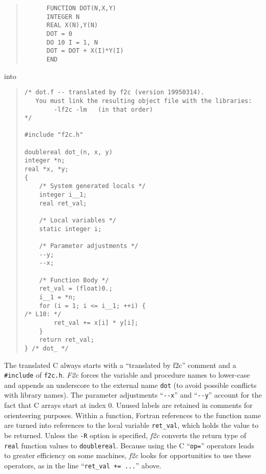 \documentclass[10pt,a4paper]{article}
\begin{document}
\begin{quote}
\begin{verbatim}
      FUNCTION DOT(N,X,Y)
      INTEGER N
      REAL X(N),Y(N)
      DOT = 0
      DO 10 I = 1, N
      DOT = DOT + X(I)*Y(I)
      END
\end{verbatim}
\end{quote}
into
\begin{quote}
\begin{verbatim}
/* dot.f -- translated by f2c (version 19950314).
   You must link the resulting object file with the libraries:
        -lf2c -lm   (in that order)
*/

#include "f2c.h"

doublereal dot_(n, x, y)
integer *n;
real *x, *y;
{
    /* System generated locals */
    integer i__1;
    real ret_val;

    /* Local variables */
    static integer i;

    /* Parameter adjustments */
    --y;
    --x;

    /* Function Body */
    ret_val = (float)0.;
    i__1 = *n;
    for (i = 1; i <= i__1; ++i) {
/* L10: */
        ret_val += x[i] * y[i];
    }
    return ret_val;
} /* dot_ */
\end{verbatim}
\end{quote}
The translated C always starts with a ``translated by f2c'' comment and a \verb|#include| of \verb|f2c.h|. \emph{F2c} forces the variable and procedure names to lower-case and appends an underscore to the external name \verb|dot| (to avoid possible conflicts with library names). The parameter adjustments ``\verb|--x|'' and ``\verb|--y|'' account for the fact that C arrays start at index 0. Unused labels are retained in comments for orienteering purposes. Within a function, Fortran references to the function name are turned into references to the local variable \verb|ret_val|, which holds the value to be returned. Unless the \verb|-R| option is specified, \emph{f2c} converts the return type of \verb|real| function values to \verb|doublereal|. Because using the C ``\verb|op=|'' operators leads to greater efficiency on some machines, \emph{f2c} looks for opportunities to use these operators, as in the line ``\verb|ret_val += ...|'' above.
\end{document}
